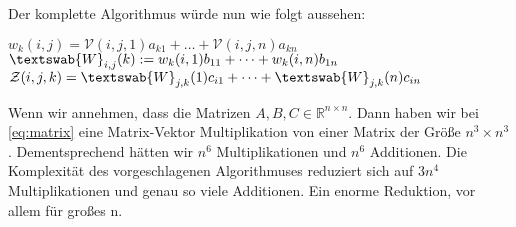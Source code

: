 Der komplette Algorithmus würde nun wie folgt aussehen:
\begin{algorithmic}
			\State $w_{k}(i,j) = \mathcal{V}(i,j,1)a_{k1} + \dots + \mathcal{V}(i,j,n)a_{kn}$
		\EndFor
	\EndFor
\EndFor
{}
			\State $\textswab{W}_{i,j} (k):= w_k(i,1) b_{11} + \dots + w_k(i,n) b_{1n}$
		\EndFor
	\EndFor
\EndFor
{}
			\State $\mathcal{Z}(i,j,k) = \textswab{W}_{j,k}(1) c_{i1}  + \dots +  \textswab{W}_{j,k}(n) c_{in}$ 
		\EndFor
	\EndFor
\EndFor
\end{algorithmic}

 
Wenn wir annehmen, dass die Matrizen $A,B,C \in \mathbb{R}^{n \times n}$. Dann haben wir bei \ref{eq:matrix} eine Matrix-Vektor Multiplikation von einer Matrix der Größe $n^{3} \times n^{3}$. Dementsprechend hätten wir $n^{6}$ Multiplikationen und $n^{6}$ Additionen. Die Komplexität des vorgeschlagenen Algorithmuses reduziert sich auf $3n^{4}$ Multiplikationen und genau so viele Additionen.
Ein enorme Reduktion, vor allem für großes n.




